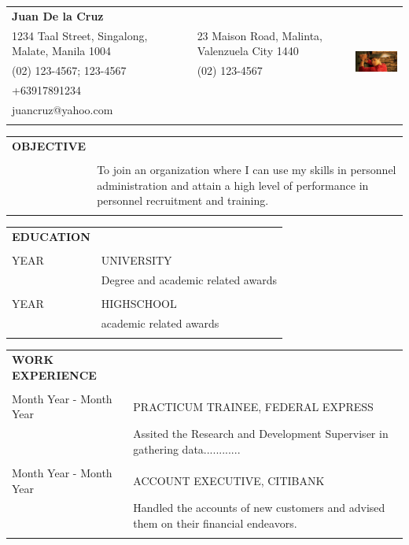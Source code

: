 \documentclass[11pt]{article}%
\begin{document}
%
\normalsize%
\begin{tabu}{X[l]  X[l]  X[r] }%
\textbf{Juan De la Cruz}&&\\%
1234 Taal Street, Singalong, Malate, Manila 1004&23 Maison Road, Malinta, Valenzuela City 1440&\\%
(02) 123{-}4567; 123{-}4567&(02) 123{-}4567&\\%
+63917891234&&\\%
juancruz@yahoo.com&&\\%
&&\\%
\end{tabu}%
\begin{tabu}{X[l] X[3l]}%
\textbf{OBJECTIVE}&\\%
&\\%
&To join an organization where I can use my skills in personnel administration and attain a high level of performance in personnel recruitment and training.\\%
&\\%
\end{tabu}%
\begin{tabu}{X[l] X[3l]}%
\textbf{EDUCATION}&\\%
&\\%
YEAR&UNIVERSITY\\%
&Degree and academic related awards\\%
&\\%
YEAR&HIGHSCHOOL\\%
&academic related awards\\%
&\\%
\end{tabu}%
\begin{tabu}{X[l] X[3l]}%
\textbf{WORK EXPERIENCE}&\\%
&\\%
Month Year {-} Month Year&PRACTICUM TRAINEE, FEDERAL EXPRESS\\%
&Assited the Research and Development Superviser in gathering data............\\%
&\\%
Month Year {-} Month Year&ACCOUNT EXECUTIVE, CITIBANK\\%
&Handled the accounts of new customers and advised them on their financial endeavors.\\%
&\\%
\end{tabu}%
\end{document}
